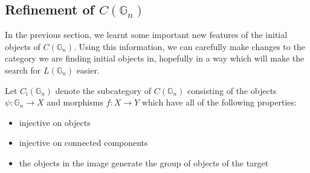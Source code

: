\documentclass{amsart} %
\begin{document}
\subsection{Refinement of $C(\mathbb{G}_n)$}

In the previous section, we learnt some important new features of the initial objects of $C(\mathbb{G}_n)$. Using this information, we can carefully make changes to the category we are finding initial objects in, hopefully in a way which will make the search for $L(\mathbb{G}_n)$ easier.

\begin{defi} Let $C_{\mathrm{i}}(\mathbb{G}_n)$ denote the subcategory of $C(\mathbb{G}_n)$ consisting of the objects $\psi: \mathbb{G}_n \to X$ and morphisms $f: X \to Y$ which have all of the following properties:
\begin{itemize}
\item injective on objects
\item injective on connected components
\item the objects in the image generate the group of objects of the target
\end{itemize}
\end{defi}
\end{document}
